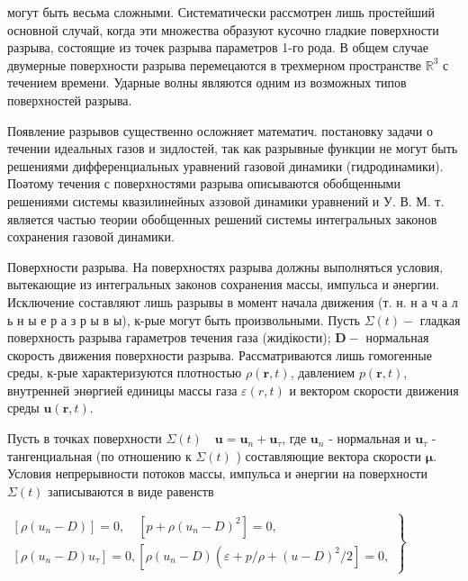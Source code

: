 \documentclass[10pt]{article}
\begin{document}
могут быть весьма сложными. Систематически рассмотрен лишь простейший основной случай, когда эти множества образуют кусочно гладкие поверхности разрыва, состоящие из точек разрыва параметров 1-го рода. В общем случае двумерные поверхности разрыва перемецаются в трехмерном пространстве $\mathbb{R}^{3}$ с течением времени. Ударные волны являются одним из возможных типов поверхностей разрыва.



Появление разрывов существенно осложняет математич. постановку задачи о течении идеальных газов и зидлостей, так как разрывные функции не могут быть решениями дифференциальных уравнений газовой динамики (гидродинамики). Поәтому течения с поверхностями разрыва описываются обобщенными решениями системы квазилинейных аззовой динамики уравнений и У. В. М. т. является частью теории обобщенных решений системы интегральных законов сохранения газовой динамики.



Поверхности разрыва. На поверхностях разрыва должны выполняться условия, вытекающие из интегральных законов сохранения массы, импульса и әнергии. Исключение составляют лишь разрывы в момент начала движения (т. н. н а ч а л ь н ы е р а з р ы в ы), к-рые могут быть произвольными. Пусть $\Sigma(t)-$ гладкая поверхность разрыва гараметров течения газа (жидікости); $\boldsymbol{D}-$ нормальная скорость движения поверхности разрыва. Рассматриваются лишь гомогенные среды, к-рые характеризуются плотностью $\rho(\boldsymbol{r}, t)$, давлением $p(\boldsymbol{r}, t)$, внутренней энөргией единицы массы газа $\varepsilon(r, t)$ и вектором скорости движения среды $\boldsymbol{u}(\boldsymbol{r}, t)$.



Пусть в точках поверхности $\Sigma(t) \quad \boldsymbol{u}=\boldsymbol{u}_{n}+\boldsymbol{u}_{\tau}$, где $\boldsymbol{u}_{n}$ - нормальная и $\boldsymbol{u}_{\tau}$ - тангенциальная (по отношению к $\Sigma(t)$ ) составляющие вектора скорости $\boldsymbol{\mu}$. Условия непрерывности потоков массы, импульса и әнергии на поверхности $\Sigma(t)$ записываются в виде равенств



$\left.\begin{array}{c}{\left[\rho\left(u_{n}-D\right)\right]=0, \quad\left[p+\rho\left(u_{n}-D\right)^{2}\right]=0,} \\ {\left[\rho\left(u_{n}-D\right) u_{\tau}\right]=0,\left[\rho\left(u_{n}-D\right)\left(\varepsilon+p / \rho+(u-D)^{2} / 2\right]=0,\right.}\end{array}\right\}$
\end{document}
